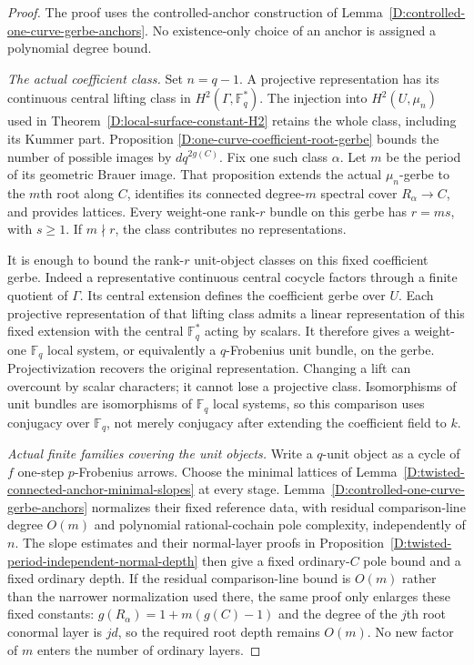 \begin{proof}
The proof uses the controlled-anchor construction of
Lemma~\ref{D:controlled-one-curve-gerbe-anchors}. No existence-only
choice of an anchor is assigned a polynomial degree bound.

\emph{The actual coefficient class.}
Set $n=q-1$. A projective representation has its continuous
central lifting class in $H^2(\Gamma,\mathbb F_q^*)$.
The injection into $H^2(U,\mu_n)$ used in
Theorem~\ref{D:local-surface-constant-H2} retains the whole
class, including its Kummer part. Proposition
\ref{D:one-curve-coefficient-root-gerbe} bounds the number
of possible images by $d q^{2g(C)}$.
Fix one such class $\alpha$. Let $m$ be the period of its
geometric Brauer image. That proposition extends the actual
$\mu_n$-gerbe to the $m$th root along $C$, identifies its
connected degree-$m$ spectral cover $R_\alpha\to C$, and
provides lattices. Every weight-one rank-$r$ bundle on this
gerbe has $r=ms$, with $s\geq1$. If $m\nmid r$, the class
contributes no representations.

It is enough to bound the rank-$r$ unit-object classes on
this fixed coefficient gerbe. Indeed a representative
continuous central cocycle factors through a finite quotient
of $\Gamma$. Its central extension defines the coefficient
gerbe over $U$. Each projective representation of that
lifting class admits a linear representation of this fixed
extension with the central $\mathbb F_q^*$ acting by scalars.
It therefore gives a weight-one $\mathbb F_q$ local system,
or equivalently a $q$-Frobenius unit bundle, on the gerbe.
Projectivization recovers the original representation.
Changing a lift can overcount by scalar characters; it cannot
lose a projective class. Isomorphisms of unit bundles are
isomorphisms of $\mathbb F_q$ local systems, so this comparison
uses conjugacy over $\mathbb F_q$, not merely conjugacy after
extending the coefficient field to $k$.

\emph{Actual finite families covering the unit objects.}
Write a $q$-unit object as a cycle of $f$ one-step
$p$-Frobenius arrows. Choose the minimal lattices of
Lemma~\ref{D:twisted-connected-anchor-minimal-slopes}
at every stage. Lemma~\ref{D:controlled-one-curve-gerbe-anchors}
normalizes their fixed reference data, with residual
comparison-line degree $O(m)$ and polynomial rational-cochain
pole complexity, independently of $n$.
The slope estimates and their normal-layer proofs in
Proposition~\ref{D:twisted-period-independent-normal-depth}
then give a fixed ordinary-$C$ pole bound and a fixed
ordinary depth. If the residual comparison-line bound is
$O(m)$ rather than the narrower normalization used there,
the same proof only enlarges these fixed constants:
$g(R_\alpha)=1+m(g(C)-1)$ and the degree of the
$j$th root conormal layer is $jd$, so the required root
depth remains $O(m)$. No new factor of $m$ enters the number
of ordinary layers.


\end{proof}
